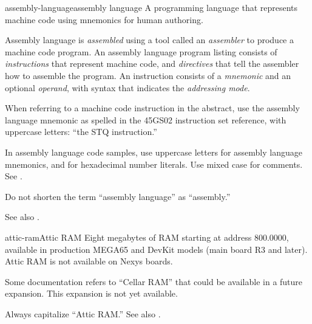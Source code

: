 \begin{sgentry}{assembly-language}{assembly language}
    A programming language that represents machine code using mnemonics for human authoring.

    Assembly language is \emph{assembled} using a tool called an \emph{assembler} to produce a machine code program. An assembly language program listing consists of \emph{instructions} that represent machine code, and \emph{directives} that tell the assembler how to assemble the program. An instruction consists of a \emph{mnemonic} and an optional \emph{operand}, with syntax that indicates the \emph{addressing mode}.

    When referring to a machine code instruction in the abstract, use the assembly language mnemonic as spelled in the 45GS02 instruction set reference, with uppercase letters: ``the STQ instruction.''

    In assembly language code samples, use uppercase letters for assembly language mnemonics, and for hexadecimal number literals. Use mixed case for comments. See .

    Do not shorten the term ``assembly language'' as ``assembly.''

    See also .
\end{sgentry}

\begin{sgentry}{attic-ram}{Attic RAM}
    Eight megabytes of RAM starting at address 800.0000, available in production MEGA65 and DevKit models (main board R3 and later). Attic RAM is not available on Nexys boards.

    Some documentation refers to ``Cellar RAM'' that could be available in a future expansion. This expansion is not yet available.

    Always capitalize ``Attic RAM.'' See also .
\end{sgentry}

